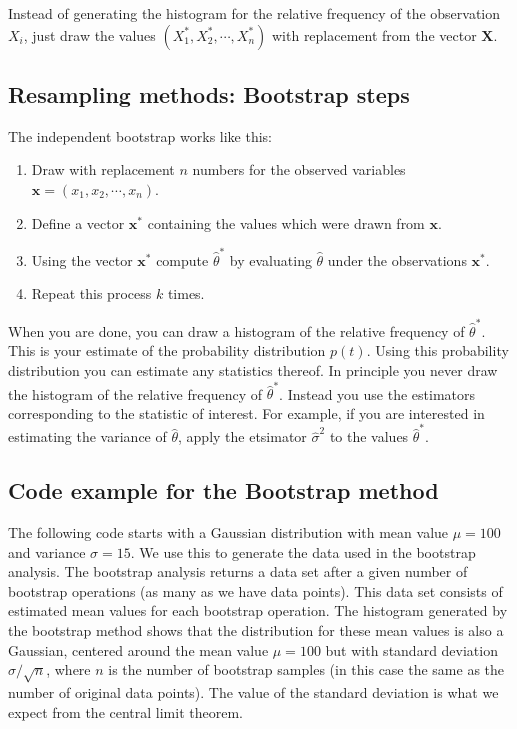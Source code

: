 \documentclass[letterpaper,10pt,english]{sphinxmanual}
\begin{document}
Instead of generating the histogram for the relative
frequency of the observation \(X_i\), just draw the values
\((X_1^*,X_2^*,\cdots,X_n^*)\) with replacement from the vector
\(\boldsymbol{X}\).


\subsection{Resampling methods: Bootstrap steps}
\label{\detokenize{chapter4:resampling-methods-bootstrap-steps}}
The independent bootstrap works like this:
\begin{enumerate}
%
\item {} 
Draw with replacement \(n\) numbers for the observed variables \(\boldsymbol{x} = (x_1,x_2,\cdots,x_n)\).

\item {} 
Define a vector \(\boldsymbol{x}^*\) containing the values which were drawn from \(\boldsymbol{x}\).

\item {} 
Using the vector \(\boldsymbol{x}^*\) compute \(\widehat{\theta}^*\) by evaluating \(\widehat \theta\) under the observations \(\boldsymbol{x}^*\).

\item {} 
Repeat this process \(k\) times.

\end{enumerate}

When you are done, you can draw a histogram of the relative frequency
of \(\widehat \theta^*\). This is your estimate of the probability
distribution \(p(t)\). Using this probability distribution you can
estimate any statistics thereof. In principle you never draw the
histogram of the relative frequency of \(\widehat{\theta}^*\). Instead
you use the estimators corresponding to the statistic of interest. For
example, if you are interested in estimating the variance of \(\widehat
\theta\), apply the etsimator \(\widehat \sigma^2\) to the values
\(\widehat \theta ^*\).


\subsection{Code example for the Bootstrap method}
\label{\detokenize{chapter4:code-example-for-the-bootstrap-method}}
The following code starts with a Gaussian distribution with mean value
\(\mu =100\) and variance \(\sigma=15\). We use this to generate the data
used in the bootstrap analysis. The bootstrap analysis returns a data
set after a given number of bootstrap operations (as many as we have
data points). This data set consists of estimated mean values for each
bootstrap operation. The histogram generated by the bootstrap method
shows that the distribution for these mean values is also a Gaussian,
centered around the mean value \(\mu=100\) but with standard deviation
\(\sigma/\sqrt{n}\), where \(n\) is the number of bootstrap samples (in
this case the same as the number of original data points). The value
of the standard deviation is what we expect from the central limit
theorem.
\end{document}

